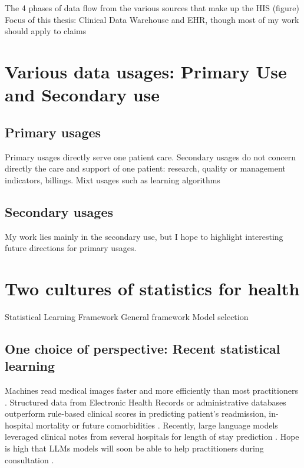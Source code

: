 \documentclass{report}
\begin{document}
The 4 phases of data flow from the various sources that make up the HIS (figure)
Focus of this thesis: Clinical Data Warehouse and EHR, though most of my work should apply to claims

\section{Various data usages: Primary Use and Secondary use}\label{sec:intro:data_usages}

\subsection{Primary usages}\label{subsec:intro:primary_usages}

Primary usages directly serve one patient care.
Secondary usages do not concern directly the care and support of one patient: research, quality or management indicators, billings.
Mixt usages such as learning algorithms


\subsection{Secondary usages}\label{subsec:intro:secondary_usages}

My work lies mainly in the secondary use, but I hope to highlight interesting future directions for primary usages.


\section{Two cultures of statistics for health}\label{sec:two_cultures}

Statistical Learning Framework
General framework
Model selection
\subsection{One choice of perspective: Recent statistical learning}\label{subsec:intro:recent_statistical_learning}
Machines read medical images faster
and more efficiently than most practitioners \citep{zhou2021review}.
Structured data from Electronic Health Records \citep{rajkomar2018scalable} or
administrative databases \citep{beaulieu2021machine} outperform rule-based
clinical scores in predicting patient's readmission, in-hospital mortality or
future comorbidities \citep{li2020behrt}. Recently, large language models
leveraged clinical notes from several hospitals for length of stay prediction
\citep{jiang2023health}. Hope is high that LLMs models will soon be able to
help practitioners during consultation \citep{lee2023benefits}.
\end{document}
